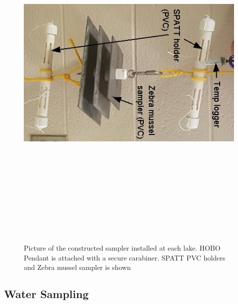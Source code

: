 \begin{figure}[!h]
\centering
\includegraphics[width=\textwidth, height=18cm]{figures/samplers}
\caption{Picture of the constructed sampler installed at each lake. HOBO Pendant is attached with a secure carabiner. SPATT PVC holders and Zebra mussel sampler is shown }
\label{fig:samplerr}
\end{figure}

\clearpage
\subsection{Water Sampling} \label{sampling}


